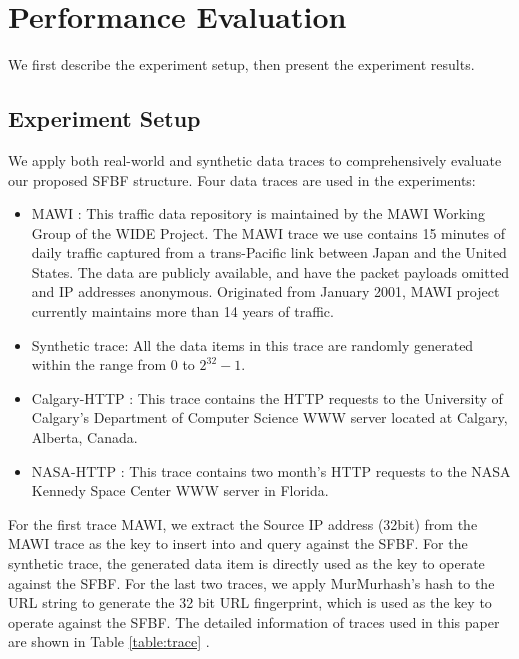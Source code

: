 \documentclass[10pt,journal,letterpaper]{IEEEtran}
\newcommand{\note}[1]{{\sffamily\itshape\bfseries\uline{#1}}}
\begin{document}
\section{Performance Evaluation}
\label{sec:simulation}
We first describe the experiment setup, then present the experiment results.
\subsection{Experiment Setup}
We apply both real-world and synthetic data traces to comprehensively evaluate our proposed SFBF structure. Four data traces are used in the experiments:

\begin{itemize}
  \item MAWI \cite{MAWI}: This traffic data repository is maintained by the MAWI Working Group of the WIDE Project. The MAWI trace we use contains 15 minutes of daily traffic captured from a trans-Pacific link between Japan and the United States. The data are publicly available, and have the packet payloads omitted and IP addresses anonymous. Originated from January 2001, MAWI project currently maintains more than 14 years of traffic.
  \item Synthetic trace: All the data items in this trace are randomly generated within the range from 0 to $2^{32}-1$.
  \item Calgary-HTTP \cite{Calgary}: This trace contains the HTTP requests to the University of Calgary's Department of Computer Science WWW server located at Calgary, Alberta, Canada.
  \item NASA-HTTP \cite{NASA}: This trace contains two month's  HTTP requests to the NASA Kennedy Space Center WWW server in Florida.
\end{itemize}


For the first trace MAWI, we extract the Source IP address (32bit) from the MAWI trace  as the key  to insert into and query against the SFBF. For the synthetic trace, the generated data item is directly used as the key to operate against the SFBF.
For the last two  traces, we apply MurMurhash's hash to the URL string to generate the 32 bit URL fingerprint,  which is used as the key to operate against the SFBF. 
The detailed information of traces used in this paper are shown in Table \ref{table:trace} .
\end{document}
